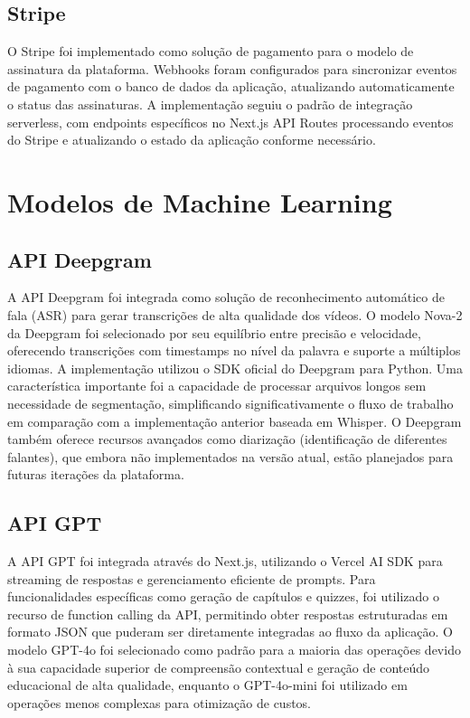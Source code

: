 \documentclass[tcc,capa]{texufpel}
\begin{document}
\subsection{Stripe}
O Stripe foi implementado como solução de pagamento para o modelo de assinatura da plataforma. Webhooks foram configurados para sincronizar eventos de pagamento com o banco de dados da aplicação, atualizando automaticamente o status das assinaturas. A implementação seguiu o padrão de integração serverless, com endpoints específicos no Next.js API Routes processando eventos do Stripe e atualizando o estado da aplicação conforme necessário.

\section{Modelos de Machine Learning}


\subsection{API Deepgram}
A API Deepgram foi integrada como solução de reconhecimento automático de fala (ASR) para gerar transcrições de alta qualidade dos vídeos. O modelo Nova-2 da Deepgram foi selecionado por seu equilíbrio entre precisão e velocidade, oferecendo transcrições com timestamps no nível da palavra e suporte a múltiplos idiomas. A implementação utilizou o SDK oficial do Deepgram para Python. Uma característica importante foi a capacidade de processar arquivos longos sem necessidade de segmentação, simplificando significativamente o fluxo de trabalho em comparação com a implementação anterior baseada em Whisper. O Deepgram também oferece recursos avançados como diarização (identificação de diferentes falantes), que embora não implementados na versão atual, estão planejados para futuras iterações da plataforma.

\subsection{API GPT}
A API GPT foi integrada através do Next.js, utilizando o Vercel AI SDK para streaming de respostas e gerenciamento eficiente de prompts. Para funcionalidades específicas como geração de capítulos e quizzes, foi utilizado o recurso de function calling da API, permitindo obter respostas estruturadas em formato JSON que puderam ser diretamente integradas ao fluxo da aplicação. O modelo GPT-4o foi selecionado como padrão para a maioria das operações devido à sua capacidade superior de compreensão contextual e geração de conteúdo educacional de alta qualidade, enquanto o GPT-4o-mini foi utilizado em operações menos complexas para otimização de custos.
\end{document}
